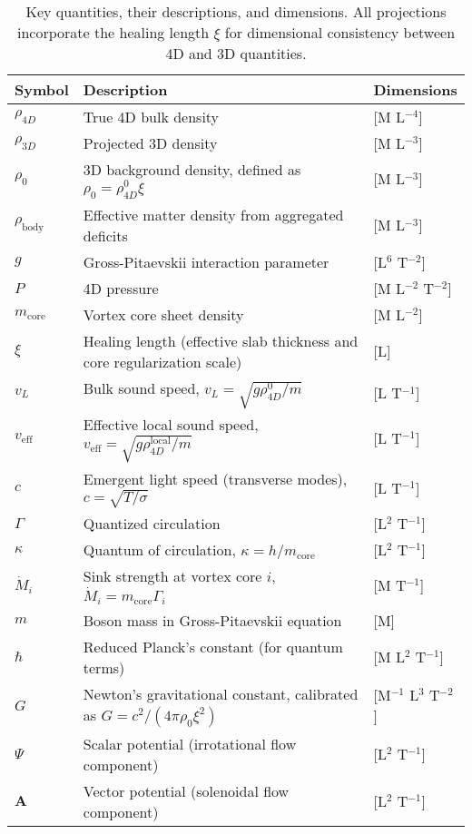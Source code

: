 \documentclass{article}
\begin{document}
\begin{table}[H]
\centering
\begin{tabular}{|l|l|l|}
\hline
Symbol & Description & Dimensions \\
\hline
$\rho_{4D}$ & True 4D bulk density & [M L$^{-4}$] \\
\hline
$\rho_{3D}$ & Projected 3D density & [M L$^{-3}$] \\
\hline
$\rho_0$ & 3D background density, defined as $\rho_0 = \rho_{4D}^0 \xi$ & [M L$^{-3}$] \\
\hline
$\rho_{\text{body}}$ & Effective matter density from aggregated deficits & [M L$^{-3}$] \\
\hline
$g$ & Gross-Pitaevskii interaction parameter & [L$^6$ T$^{-2}$] \\
\hline
$P$ & 4D pressure & [M L$^{-2}$ T$^{-2}$] \\
\hline
$m_{\text{core}}$ & Vortex core sheet density & [M L$^{-2}$] \\
\hline
$\xi$ & Healing length (effective slab thickness and core regularization scale) & [L] \\
\hline
$v_L$ & Bulk sound speed, $v_L = \sqrt{g \rho_{4D}^0 / m}$ & [L T$^{-1}$] \\
\hline
$v_{\text{eff}}$ & Effective local sound speed, $v_{\text{eff}} = \sqrt{g \rho_{4D}^{\text{local}} / m}$ & [L T$^{-1}$] \\
\hline
$c$ & Emergent light speed (transverse modes), $c = \sqrt{T / \sigma}$ & [L T$^{-1}$] \\
\hline
$\Gamma$ & Quantized circulation & [L$^2$ T$^{-1}$] \\
\hline
$\kappa$ & Quantum of circulation, $\kappa = h / m_{\text{core}}$ & [L$^2$ T$^{-1}$] \\
\hline
$\dot{M}_i$ & Sink strength at vortex core $i$, $\dot{M}_i = m_{\text{core}} \Gamma_i$ & [M T$^{-1}$] \\
\hline
$m$ & Boson mass in Gross-Pitaevskii equation & [M] \\
\hline
$\hbar$ & Reduced Planck's constant (for quantum terms) & [M L$^2$ T$^{-1}$] \\
\hline
$G$ & Newton's gravitational constant, calibrated as $G = c^2 / (4\pi \rho_0 \xi^2)$ & [M$^{-1}$ L$^3$ T$^{-2}$] \\
\hline
$\Psi$ & Scalar potential (irrotational flow component) & [L$^2$ T$^{-1}$] \\
\hline
$\mathbf{A}$ & Vector potential (solenoidal flow component) & [L$^2$ T$^{-1}$] \\
\hline
\end{tabular}
\caption{Key quantities, their descriptions, and dimensions. All projections incorporate the healing length $\xi$ for dimensional consistency between 4D and 3D quantities.}
\label{tab:notation}
\end{table}
\end{document}
